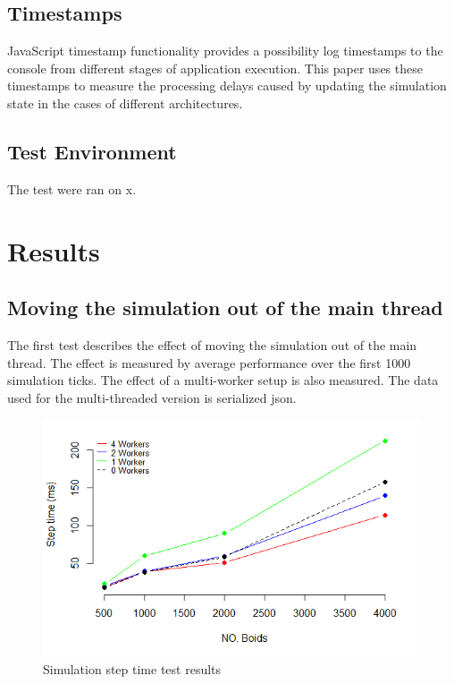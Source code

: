 \documentclass[conference, 9pt]{IEEEtran}
\begin{document}
\subsection{Timestamps}

JavaScript timestamp functionality provides a possibility log timestamps to the console from different stages of application execution. This paper uses these timestamps to
measure the processing delays caused by updating the simulation state in the cases of different architectures.

\subsection{Test Environment}
\label{sec:environment}

The test were ran on x.

\section{Results}
\label{sec:sec2}


\subsection{Moving the simulation out of the main thread}

The first test describes the effect of moving the simulation out of the main thread. The effect is measured by average performance over the first 1000 simulation ticks. The effect of a multi-worker setup is also measured. The data used for the multi-threaded version is serialized json.


\begin{figure}[ht]
	\centering
	\includegraphics[scale=0.5]{figs/plot_boids.png}
	\caption{Simulation step time test results}
	\label{fig:step_time}
\end{figure}
\end{document}
